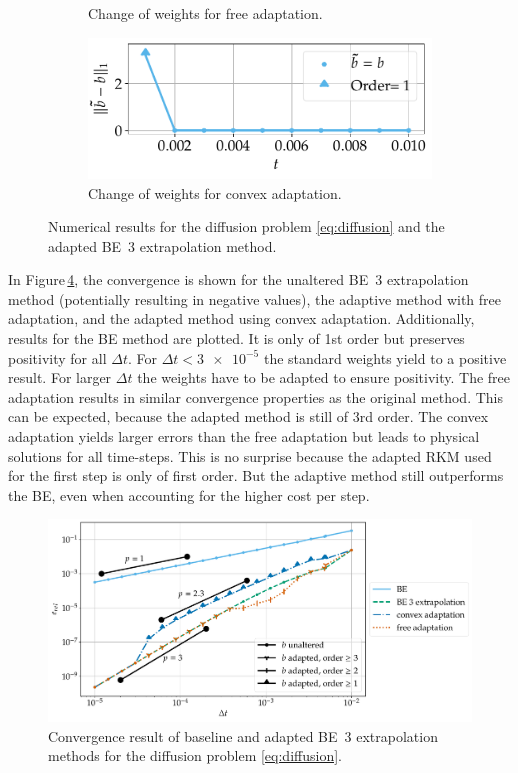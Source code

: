 \documentclass[a4paper]{article}
\numberwithin{equation}{section}
\theoremstyle{plain}
\theoremstyle{definition}
\numberwithin{theorem}{section}
\newcommand{\dt}{{\Delta t}}
\newcommand{\1}{\mathbbm{1}}
\begin{document}
\begin{figure}
\begin{subfigure}[b]{0.45\textwidth}
\caption{Change of weights for free adaptation.}
\label{fig:weights_Diff_a}
\end{subfigure}
\begin{subfigure}[b]{0.45\textwidth}
\centering
\includegraphics[width=1\textwidth]{plots/b_Diff_Convex.pdf}
\caption{Change of weights for convex adaptation.}
\label{fig:weights_Diff_c}
\end{subfigure}
\caption{Numerical results for the diffusion problem \eqref{eq:diffusion} and the
         adapted BE~3 extrapolation method.}
\end{figure}


In Figure\,\ref{fig:conv_impl}, the convergence is shown for the unaltered BE~3 extrapolation method (potentially resulting in negative values), the adaptive method with free adaptation, and the adapted method using convex adaptation.
Additionally, results for the BE method are plotted. It is only of 1st order but preserves positivity for all $\dt$.
For $\dt < \num{3e-5} $ the standard weights yield to a positive result. For larger $\dt$ the weights have to be adapted to ensure positivity.
The free adaptation results in similar convergence properties as the original method.
This can be expected, because the adapted method is still of 3rd order.
The convex adaptation yields larger errors than the free adaptation but leads to physical solutions for all time-steps.
This is no surprise because the adapted RKM used for the first step is only of first order.
But the adaptive method still outperforms the BE, even when accounting for the higher cost per step.

\begin{figure}[ht]
\centering
\includegraphics[width=\textwidth]{plots/conv_heat.pdf}
\caption{Convergence result of baseline and adapted BE~3
         extrapolation methods for the diffusion problem \eqref{eq:diffusion}.}
\label{fig:conv_impl}
\end{figure}
\end{document}
